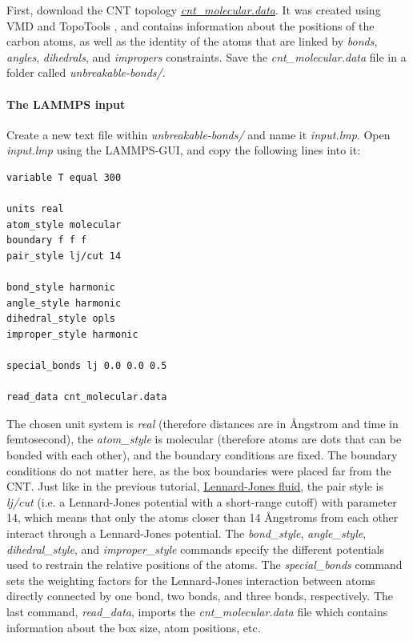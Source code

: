 \documentclass[9pt,tutorial]{livecoms}
\newcommand{\filepath}{https://raw.githubusercontent.com/lammpstutorials/lammpstutorials-article/main/files/}
\begin{document}
First, download the CNT topology
\href{\filepath tutorial2/unbreakable-bonds/cnt_molecular.data}{\textit{cnt\_molecular.data}}.
It was created using VMD and TopoTools \cite{kohlmeyer2017topotools}, and contains
information about the positions of the carbon atoms, as well as the identity of
the atoms that are linked by \textit{bonds}, \textit{angles}, \textit{dihedrals},
and \textit{impropers} constraints. Save the \textit{cnt\_molecular.data} file
in a folder called \textit{unbreakable-bonds/}.

\paragraph{The LAMMPS input}
Create a new text file within \textit{unbreakable-bonds/} and name
it \textit{input.lmp}. Open \textit{input.lmp} using the LAMMPS-GUI, and copy
the following lines into it:
{\normalsize \begin{verbatim}
variable T equal 300

units real
atom_style molecular
boundary f f f
pair_style lj/cut 14

bond_style harmonic
angle_style harmonic
dihedral_style opls
improper_style harmonic

special_bonds lj 0.0 0.0 0.5

read_data cnt_molecular.data
\end{verbatim}}
The chosen unit system is \textit{real} (therefore distances are in Ångstrom
and time in femtosecond), the \textit{atom\_style} is molecular (therefore
atoms are dots that can be bonded with each other), and the boundary conditions
are fixed. The boundary conditions do not matter here, as the box boundaries
were placed far from the CNT. Just like in the previous tutorial,
\hyperref[lennard-jones-label]{Lennard-Jones fluid}, the pair style
is \textit{lj/cut} (i.e. a Lennard-Jones potential with a short-range cutoff)
with parameter 14, which means that only the atoms closer than 14 Ångstroms
from each other interact through a Lennard-Jones potential.
The \textit{bond\_style}, \textit{angle\_style}, \textit{dihedral\_style},
and \textit{improper\_style} commands specify the different potentials used
to restrain the relative positions of the atoms. The \textit{special\_bonds}
command sets the weighting factors for the Lennard-Jones interaction between
atoms directly connected by one bond, two bonds, and three bonds, respectively.
The last command, \textit{read\_data}, imports the
\textit{cnt\_molecular.data} file which contains information about the box
size, atom positions, etc.
\end{document}
